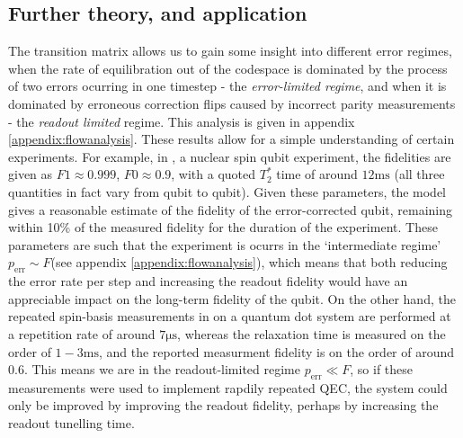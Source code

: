 \documentclass{report}
\begin{document}
\subsection{Further theory, and application}
The transition matrix allows us to gain some insight into different error regimes, when the rate of equilibration out of the codespace is dominated by the process of two errors ocurring in one timestep - the \textit{error-limited regime}, and when it is dominated by erroneous correction flips caused by incorrect parity measurements - the \textit{readout limited} regime. This analysis is given in appendix \ref{appendix:flowanalysis}. These results allow for a simple understanding of certain experiments. For example, in \cite{Cramer2016}, a nuclear spin qubit experiment, the fidelities are given as $F1\approx0.999$, $F0\approx0.9$, with a quoted $T_2^*$ time of around $12\unit{\milli\second}$ (all three quantities in fact vary from qubit to qubit). Given these parameters, the model gives a reasonable estimate of the fidelity of the error-corrected qubit, remaining within 10\% of the measured fidelity for the duration of the experiment. These parameters are such that the experiment is ocurrs in the `intermediate regime' $p_{\text{err}}\sim F$(see appendix \ref{appendix:flowanalysis}), which means that both reducing the error rate per step and increasing the readout fidelity would have an appreciable impact on the long-term fidelity of the qubit. On the other hand, the repeated spin-basis measurements in \cite{Nakajima2019} on a quantum dot system are performed at a repetition rate of around $7\unit{\micro\second}$, whereas the relaxation time is measured on the order of $1-3\unit{\milli\second}$, and the reported measurment fidelity is on the order of around $0.6$.  This means we are in the readout-limited regime $p_{\text{err}}\ll F$, so if these measurements were used to implement rapdily repeated QEC, the system could only be improved by improving the readout fidelity, perhaps by increasing the readout tunelling time.
\end{document}
